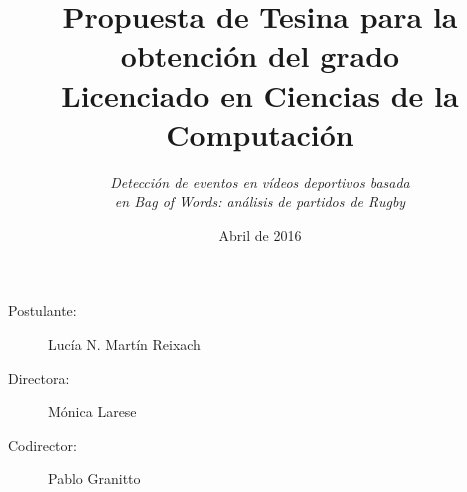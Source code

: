 \documentclass[10pt]{article}
\begin{document}
\date{Abril de 2016}
\title{Propuesta de Tesina para la obtención del grado\\Licenciado en Ciencias de la Computación}
\author{\textit{\large Detección de eventos en vídeos deportivos basada} \\ \textit{\large en Bag of Words: análisis de partidos de Rugby}}

\maketitle

\begin{description}
  \item[Postulante:] Lucía N. Martín Reixach
  \item[Directora:] Mónica Larese
  \item[Codirector:] Pablo Granitto
\end{description}













\nocite{yang2007evaluating}
\printbibliography
\end{document}
